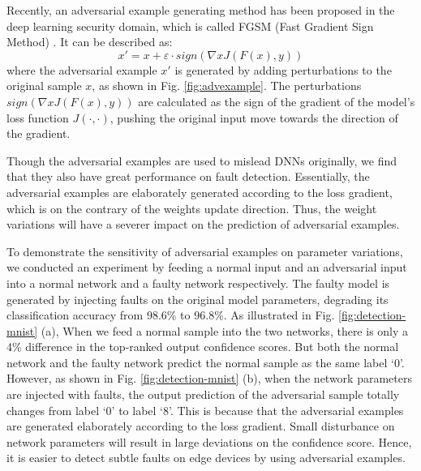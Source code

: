 Recently, an adversarial example generating method has been proposed in the deep learning security domain, which is called FGSM (Fast Gradient Sign Method) \cite{43405}. It can be described as:
\begin{equation}
    \label{equ:adv_generate}
    x' = x + \varepsilon  \cdot sign(\nabla xJ(F(x),y))
\end{equation} 
where the adversarial example $x'$ is generated by adding perturbations to the original sample $x$, as shown in Fig. \ref{fig:advexample}. The perturbations $sign(\nabla xJ(F(x),y))$ are calculated as the sign of the gradient of the model's loss function $J(\cdot,\cdot)$, pushing the original input move towards the direction of the gradient. 
                                                                                                                                        
Though the adversarial examples are used to mislead DNNs originally, we find that they also have great performance on fault detection. Essentially, the adversarial examples are elaborately generated according to the loss gradient, which is on the contrary of the weights update direction. Thus, the weight variations will have a severer impact on the prediction of adversarial examples.  
                                                                                                                                                
To demonstrate the sensitivity of adversarial examples on parameter variations, we conducted an experiment by feeding a normal input and an adversarial input into a normal network and a faulty network respectively. The faulty model is generated by injecting faults on the original model parameters, degrading its classification accuracy from {98.6\%} to {96.8\%}. 
                                                                                                                                                        As illustrated in Fig. \ref{fig:detection-mnist} (a), When we feed a normal sample into the two networks, there is only a {4\%} difference in the top-ranked output confidence scores. But both the normal network and the faulty network predict the normal sample as the same label `0'. However, as shown in Fig. \ref{fig:detection-mnist} (b),  when the network parameters are injected with faults, the output prediction of the adversarial sample totally changes from label `0' to label `8'. This is because that the adversarial examples are generated elaborately according to the loss gradient. Small disturbance on network parameters will result in large deviations on the confidence score. Hence, it is easier to detect subtle faults on edge devices by using adversarial examples.
                                                                                                                                                            
